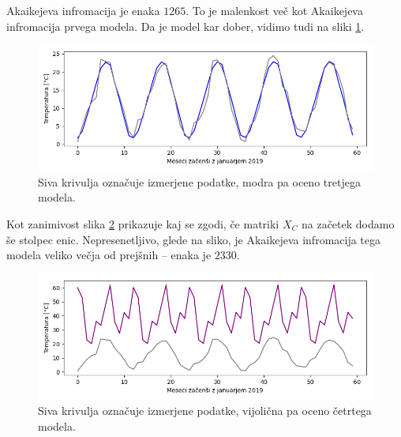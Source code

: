 \documentclass[12pt, a4paper]{article}
\begin{document}
Akaikejeva infromacija je enaka $1265$. To je malenkost
več kot Akaikejeva infromacija prvega modela. Da je model 
kar dober, vidimo tudi na sliki \ref{png:tretji}.
\begin{figure}[H]
    \centering
    \includegraphics[width=14cm]{Slike/tretji_model.png}
    \caption{Siva krivulja označuje izmerjene podatke, modra pa oceno 
    tretjega modela.}
    \label{png:tretji}
\end{figure}
Kot zanimivost slika \ref{png:cetrti} prikazuje kaj se zgodi, 
če matriki $X_C$ na začetek dodamo še stolpec enic.
Nepresenetljivo, glede na sliko, je Akaikejeva infromacija tega modela veliko 
večja od prejšnih -- enaka je $2330$.
\begin{figure}[H]
    \centering
    \includegraphics[width=14cm]{Slike/cetrti_model.png}
    \caption{Siva krivulja označuje izmerjene podatke, vijolična pa oceno 
    četrtega modela.}
    \label{png:cetrti}
\end{figure}

\newpage

\nocite{*}
\printbibliography
{}
\end{document}
